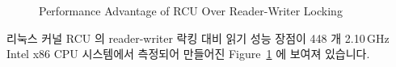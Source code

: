 \begin{figure}[tb]
\centering
{}
\caption{Performance Advantage of RCU Over Reader-Writer Locking}
\label{fig:defer:Performance Advantage of RCU Over Reader-Writer Locking}
\end{figure}

리눅스 커널 RCU 의 reader-writer 락킹 대비 읽기 성능 장점이
448 개 2.10\,GHz Intel x86 CPU 시스템에서 측정되어 만들어진
Figure~\ref{fig:defer:Performance Advantage of RCU Over Reader-Writer Locking}
에 보여져 있습니다.

